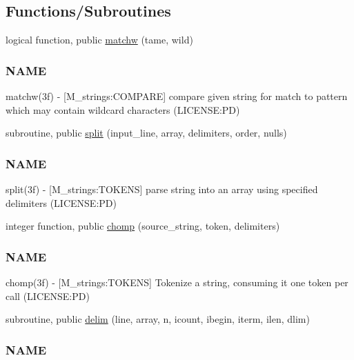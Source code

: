 \subsection*{Functions/\+Subroutines}
\begin{DoxyCompactItemize}
\item 
logical function, public \mbox{\hyperlink{namespacem__strings_a5f96f66162f0f04d58b4f5dced8e82c6}{matchw}} (tame, wild)
\begin{DoxyCompactList}\small\item\em \subsubsection*{N\+A\+ME}

matchw(3f) -\/ \mbox{[}M\+\_\+strings\+:C\+O\+M\+P\+A\+RE\mbox{]} compare given string for match to pattern which may contain wildcard characters (L\+I\+C\+E\+N\+SE\+:PD) \end{DoxyCompactList}\item 
subroutine, public \mbox{\hyperlink{namespacem__strings_a3f0119fab962146c7656cad592dd9acd}{split}} (input\+\_\+line, array, delimiters, order, nulls)
\begin{DoxyCompactList}\small\item\em \subsubsection*{N\+A\+ME}

split(3f) -\/ \mbox{[}M\+\_\+strings\+:T\+O\+K\+E\+NS\mbox{]} parse string into an array using specified delimiters (L\+I\+C\+E\+N\+SE\+:PD) \end{DoxyCompactList}\item 
integer function, public \mbox{\hyperlink{namespacem__strings_aa3fc15a665eeff512b7f5269029f558d}{chomp}} (source\+\_\+string, token, delimiters)
\begin{DoxyCompactList}\small\item\em \subsubsection*{N\+A\+ME}

chomp(3f) -\/ \mbox{[}M\+\_\+strings\+:T\+O\+K\+E\+NS\mbox{]} Tokenize a string, consuming it one token per call (L\+I\+C\+E\+N\+SE\+:PD) \end{DoxyCompactList}\item 
subroutine, public \mbox{\hyperlink{namespacem__strings_a9890da826d63d6f04367887007611cb5}{delim}} (line, array, n, icount, ibegin, iterm, ilen, dlim)
\begin{DoxyCompactList}\small\item\em \subsubsection*{N\+A\+ME}


\end{DoxyCompactList}
\end{DoxyCompactItemize}
